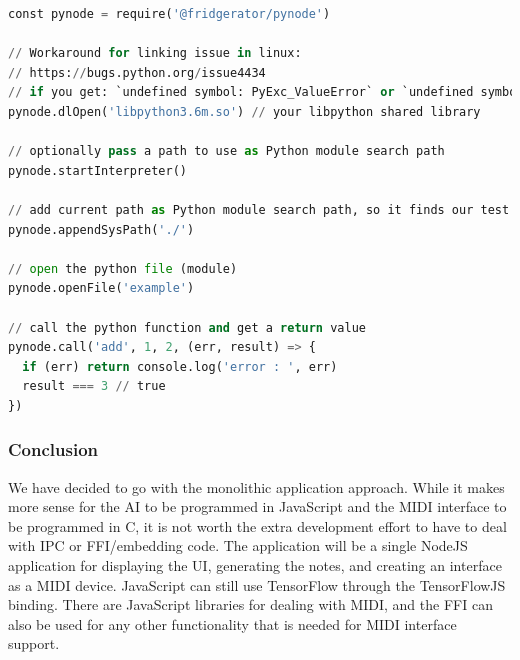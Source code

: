 \begin{minipage}{\linewidth}

  \begin{lstlisting}[language=Python, label={lst:pynode}, caption=Example of using \url{pynode} to embed python in JavaScript \autocite{pynode}., breaklines=true]
const pynode = require('@fridgerator/pynode')

// Workaround for linking issue in linux:
// https://bugs.python.org/issue4434
// if you get: `undefined symbol: PyExc_ValueError` or `undefined symbol: PyExc_SystemError`
pynode.dlOpen('libpython3.6m.so') // your libpython shared library

// optionally pass a path to use as Python module search path
pynode.startInterpreter()

// add current path as Python module search path, so it finds our test.py
pynode.appendSysPath('./')

// open the python file (module)
pynode.openFile('example')

// call the python function and get a return value
pynode.call('add', 1, 2, (err, result) => {
  if (err) return console.log('error : ', err)
  result === 3 // true
})
\end{lstlisting}

\end{minipage}

\subsubsection{Conclusion}

We have decided to go with the monolithic application approach. While it makes more sense
for the AI to be programmed in JavaScript and the MIDI interface to be programmed in C, it
is not worth the extra development effort to have to deal with IPC or FFI/embedding code.
The application will be a single NodeJS application for displaying the UI, generating the
notes, and creating an interface as a MIDI device. JavaScript can still use TensorFlow
through the TensorFlowJS binding. There are JavaScript libraries for dealing with MIDI,
and the FFI can also be used for any other functionality that is needed for MIDI interface
support.
